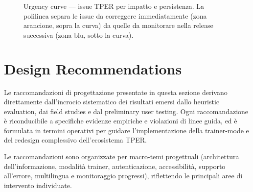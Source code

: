 \documentclass[11pt,a4paper]{article}
\begin{document}
\begin{figure}[H]
\caption{Urgency curve --- issue TPER per impatto e persistenza.
  La polilinea separa le issue da correggere immediatamente (zona arancione,
  sopra la curva) da quelle da monitorare nella release successiva
  (zona blu, sotto la curva).}
\label{fig:urgency-curve}
\end{figure}

\newpage


\section{Design Recommendations}

\label{sec:design-recommendations}

Le raccomandazioni di progettazione presentate in questa sezione derivano
direttamente dall'incrocio sistematico dei risultati emersi dallo heuristic
evaluation, dai field studies e dal preliminary user testing. Ogni
raccomandazione è riconducibile a specifiche evidenze empiriche e violazioni
di linee guida, ed è formulata in termini operativi per guidare
l'implementazione della trainer-mode e del redesign complessivo
dell'ecosistema TPER.

Le raccomandazioni sono organizzate per macro-temi progettuali (architettura
dell'informazione, modalità trainer, autenticazione, accessibilità, supporto
all'errore, multilingua e monitoraggio progressi), riflettendo le principali
aree di intervento individuate.
\end{document}
